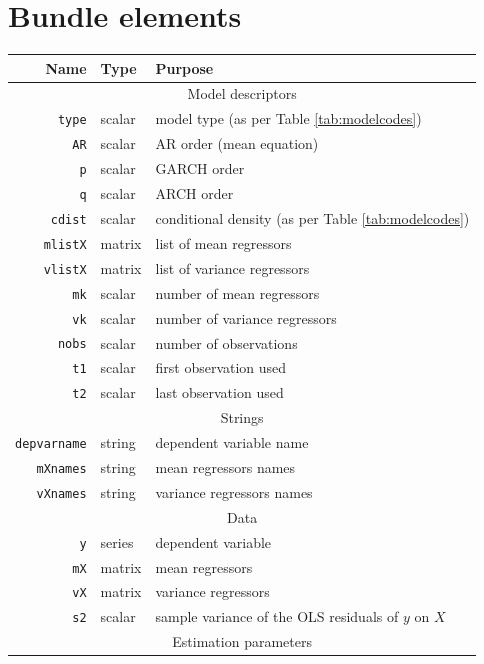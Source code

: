\documentclass[a4paper,11pt]{article}
\newcounter{script}[section]
\begin{document}
\section{Bundle elements}
\label{sec:bundle_struct}
\begin{footnotesize}
\begin{tabular}{rlp{}}
  \hline
  \textbf{Name} & \textbf{Type} & \textbf{Purpose} \\
  \hline
  \multicolumn{3}{c}{Model descriptors} \\
  \hline
  \texttt{type} & scalar & model type (as per Table \ref{tab:modelcodes})\\
  \texttt{AR} & scalar & AR order (mean equation) \\
  \texttt{p} & scalar & GARCH order\\
  \texttt{q} & scalar & ARCH order\\
  \texttt{cdist} & scalar & conditional density (as per Table \ref{tab:modelcodes})\\
  \texttt{mlistX} & matrix & list of mean regressors \\
  \texttt{vlistX} & matrix & list of variance regressors \\
  \texttt{mk} & scalar & number of mean regressors \\
  \texttt{vk} & scalar & number of variance regressors\\
  \texttt{nobs} & scalar & number of observations \\
  \texttt{t1} & scalar & first observation used \\
  \texttt{t2} & scalar & last observation used \\
  \hline
  \multicolumn{3}{c}{Strings} \\
  \hline
  \texttt{depvarname} & string & dependent variable name\\
  \texttt{mXnames} & string    & mean regressors names \\
  \texttt{vXnames} & string    & variance regressors names \\
  \hline
  \multicolumn{3}{c}{Data} \\
  \hline
  \texttt{y} & series  & dependent variable \\
  \texttt{mX} & matrix & mean regressors \\
  \texttt{vX} & matrix & variance regressors\\
  \texttt{s2} & scalar & sample variance of the OLS residuals of $y$ on $X$
  \\
  \hline
  \multicolumn{3}{c}{Estimation parameters} \\

\end{tabular}
\end{footnotesize}
\end{document}

